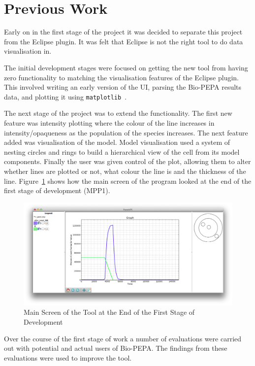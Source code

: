\section{Previous Work}

Early on in the first stage of the project it was decided to separate this project from the Eclipse plugin.  It was felt that Eclipse is not the right tool to do data visualisation in.

The initial development stages were focused on getting the new tool from having zero functionality to matching the visualisation features of the Eclipse plugin.  This involved writing an early version of the \ac{UI}, parsing the Bio-PEPA results data, and plotting it using \texttt{matplotlib}~\cite{mpl}.

The next stage of the project was to extend the functionality.  The first new feature was intensity plotting where the colour of the line increases in intensity/opaqueness as the population of the species increases.  The next feature added was visualisation of the model.  Model visualisation used a system of nesting circles and rings to build a hierarchical view of the cell from its model components.  Finally the user was given control of the plot, allowing them to alter whether lines are plotted or not, what colour the line is and the thickness of the line.  Figure~\ref{fig:f75_mac_intro} shows how the main screen of the program looked at the end of the first stage of development (MPP1).

\begin{figure}[h!]
    \centering
    \includegraphics[width=\textwidth]{images/french75_mac.png}
    \caption{Main Screen of the Tool at the End of the First Stage of Development}
    \label{fig:f75_mac_intro}
\end{figure}

Over the course of the first stage of work a number of evaluations were carried out with potential and actual users of Bio-PEPA.  The findings from these evaluations were used to improve the tool.


